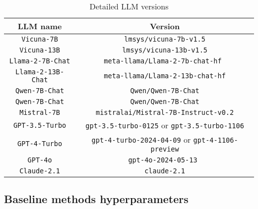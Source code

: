 \begin{table}[h]
\centering
\begin{tabular}{c|c}
\hline
\textbf{LLM name} & \textbf{Version} \\ 
\hline
\hline
\texttt{Vicuna-7B} & \texttt{lmsys/vicuna-7b-v1.5} \\ 
\hline
\texttt{Vicuna-13B} & \texttt{lmsys/vicuna-13b-v1.5} \\ 
\hline
\texttt{Llama-2-7B-Chat} & \texttt{meta-llama/Llama-2-7b-chat-hf }\\
\hline
\texttt{Llama-2-13B-Chat} & \texttt{meta-llama/Llama-2-13b-chat-hf}\\
\hline
\texttt{Qwen-7B-Chat} & \texttt{Qwen/Qwen-7B-Chat}\\
\hline
\texttt{Qwen-7B-Chat} & \texttt{Qwen/Qwen-7B-Chat}\\
\hline
\texttt{Mistral-7B} & \texttt{mistralai/Mistral-7B-Instruct-v0.2}\\
\hline
\texttt{GPT-3.5-Turbo} & \texttt{gpt-3.5-turbo-0125} or \texttt{gpt-3.5-turbo-1106}\\
\hline
\texttt{GPT-4-Turbo} & \texttt{gpt-4-turbo-2024-04-09} or \texttt{gpt-4-1106-preview}\\
\hline
\texttt{GPT-4o} & \texttt{gpt-4o-2024-05-13	}\\
\hline
\texttt{Claude-2.1} & \texttt{claude-2.1}\\
\hline
\end{tabular}
\caption{Detailed LLM versions}\label{tab:llm_version}
\end{table}





\subsection{Baseline methods hyperparameters}





